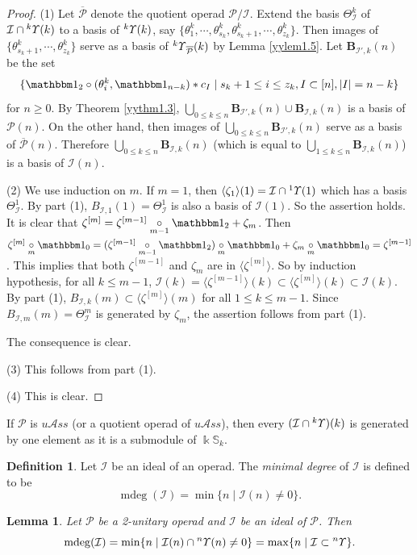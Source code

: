 \documentclass{amsart}
\newtheorem{lem}[thm]{Lemma}
\theoremstyle{definition}
\newtheorem{Def}[thm]{Definition}
\theoremstyle{remark}
\numberwithin{equation}{section}
\def\S{\mathbb{S}}
\def\mdeg{\operatorname{mdeg}}
\newcommand{\lr}[1]{\langle #1 \rangle}
\newcommand{\ucr}[1]{\underset{#1}{\circ}}
\newcommand{\up}[1]{{^{#1}{\it \!\Upsilon}}}
\def \uas{u\mathcal{A}ss}
\def \I{\mathcal{I}}
\def \ip{{\mathcal{P}}}
\def \1{\mathbbm 1}
\def \S{\mathbb{S}}
\begin{document}
\begin{proof}
(1) Let $\overline{\ip}$ denote the quotient operad $\ip/\I$.
Extend the basis $\Theta^k_{\I}$ of $\I\cap \up{k}(k)$ to 
a basis of $\up{k}(k)$, say
$\{\theta_1^k, \cdots, \theta_{s_k}^k, \theta_{s_k+1}^k,
\cdots, \theta_{z_k}^k\}$.
Then images of $\{\theta_{s_k+1}^k,\cdots, \theta_{z_k}^k\}$ serve as a 
basis of $\up{k}_{\overline{\ip}}(k)$ by Lemma \ref{yylem1.5}. 
Let $\textbf{B}_{\I',k}(n)$ be the set
\[\{\1_2\circ (\theta_i^k, \1_{n-k})\ast c_I
\mid s_k+1\le i\le z_k, I\subset [n], |I|=n-k\}\]
for $n\geq 0$. By Theorem \ref{yythm1.3}, 
$\bigcup\limits_{0\le k\le n} \textbf{B}_{\I',k}(n) 
\cup \textbf{B}_{\I,k}(n)$ is a basis of $\ip(n)$. 
On the other hand, then images of 
$\bigcup\limits_{0\le k\le n} \textbf{B}_{\I',k}(n)$ serve
as a basis of $\overline{\ip}(n)$. Therefore 
$\bigcup\limits_{0\le k\le n} \textbf{B}_{\I,k}(n)$
(which is equal to $\bigcup\limits_{1\le k\le n} \textbf{B}_{\I,k}(n)$)
is a basis of $\I(n)$. 

(2) We use induction on $m$. If $m=1$, then $\lr{\zeta_1}(1)=
\I\cap \up{1}(1)$ which has a basis $\Theta^1_{\I}$. By part (1),
$B_{\I,1}(1)=\Theta^1_{\I}$ is also a basis of $\I(1)$. So
the assertion holds. It is clear that 
$\zeta^{[m]}=\zeta^{[m-1]}\ucr{m-1} \1_2+\zeta_m$. Then 
$\zeta^{[m]}\ucr{m} \1_0=(\zeta^{[m-1]}\ucr{m-1} \1_2)\ucr{m} \1_0
+\zeta_m\ucr{m}\1_0=\zeta^{[m-1]}$. This implies that both
$\zeta^{[m-1]}$ and $\zeta_{m}$ are in $\lr{\zeta^{[m]}}$.
So by induction 
hypothesis, for all $k\leq m-1$, $\I(k)=\lr{\zeta^{[m-1]}}(k)
\subset \lr{\zeta^{[m]}}(k)\subset \I(k)$. By part (1),
$B_{\I,k}(m) \subset \lr{\zeta^{[m]}}(m)$ for all
$1\leq k\leq m-1$. Since $B_{\I,m}(m)=\Theta^{m}_{\I}$ is 
generated by $\zeta_{m}$, the assertion follows from part (1).

The consequence is clear.

(3) This follows from part (1).

(4) This is clear.
\end{proof}

If $\ip$ is $\uas$ (or a quotient operad of $\uas$), then
every $(\I\cap \up{k})(k)$ is generated by one element 
as it is a submodule of $\Bbbk\S_{k}$. 

\begin{Def}
\label{yydef1.11}
Let $\I$ be an ideal of an operad. The 
{\it minimal degree} of $\I$ is defined to be
$$\mdeg(\I)=\min\{ n\mid \I(n)\neq 0\}.$$
\end{Def}


\begin{lem}
\label{yylem1.12}
Let $\ip$ be a 2-unitary operad and $\I$ be an ideal of $\ip$.
Then $$\mdeg(\I)=\min\{n \mid \I(n)\cap \up{n}(n)\neq 0\}
=\max\{n\mid \I\subset \up{n}\}.$$
\end{lem}
\end{document}
